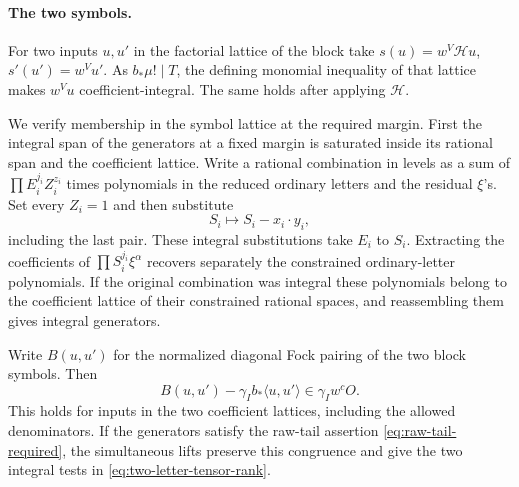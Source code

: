 \paragraph{The two symbols.}
For two inputs \(u,u'\) in the factorial lattice of the block
take \(s(u)=w^V\mathcal H u\), \(s'(u')=w^V u'\).
As \(b_*\mu!\mid T\), the defining monomial inequality of
that lattice makes \(w^V u\) coefficient-integral. The same
holds after applying \(\mathcal H\).

We verify membership in the symbol lattice at the required
margin. First the integral span of the generators at a fixed
margin is saturated inside its rational span and the
coefficient lattice. Write a rational combination in levels
as a sum of \(\prod E_i^{j_i}Z_i^{z_i}\) times polynomials in
the reduced ordinary letters and the residual \(\xi\)'s.
Set every \(Z_i=1\) and then substitute
\[
 S_i\mapsto S_i-x_i\cdot y_i,
\]
including the last pair. These integral substitutions
take \(E_i\) to \(S_i\). Extracting the coefficients of
\(\prod S_i^{j_i}\xi^\alpha\) recovers separately the
constrained ordinary-letter polynomials. If the original
combination was integral these polynomials belong to the
coefficient lattice of their constrained rational spaces,
and reassembling them gives integral generators.

\begin{proposition}
\label{prop:digit-symbol-pairing}
Write \(B(u,u')\) for the normalized diagonal Fock pairing of the two block symbols. Then
\[
 B(u,u')-\gamma_I b_*\langle u,u'\rangle\in\gamma_I w^c O.
\]
 This holds for inputs in the two coefficient
lattices, including the allowed denominators. If the generators satisfy
the raw-tail assertion \eqref{eq:raw-tail-required}, the simultaneous
lifts preserve this congruence and give the two integral tests in
\eqref{eq:two-letter-tensor-rank}.
\end{proposition}

